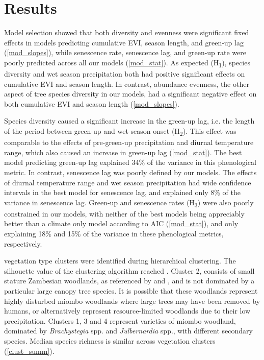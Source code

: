 \documentclass[11pt,a4paper]{article}
\begin{document}
\section{Results}

Model selection showed that both diversity and evenness were significant fixed effects in models predicting cumulative EVI, season length, and green-up lag (\autoref{mod_slopes}), while senescence rate, senescence lag, and green-up rate were poorly predicted across all our models (\autoref{mod_stat}). As expected (H\textsubscript{1}), species diversity and wet season precipitation both had positive significant effects on cumulative EVI and season length. In contrast, abundance evenness, the other aspect of tree species diversity in our models, had a significant negative effect on both cumulative EVI and season length (\autoref{mod_slopes}).

Species diversity caused a significant increase in the green-up lag, i.e. the length of the period between green-up and wet season onset (H\textsubscript{2}). This effect was comparable to the effects of pre-green-up precipitation and diurnal temperature range, which also caused an increase in green-up lag (\autoref{mod_stat}). The best model predicting green-up lag explained 34\% of the variance in this phenological metric. In contrast, senescence lag was poorly defined by our models. The effects of diurnal temperature range and wet season precipitation had wide confidence intervals in the best model for senescence lag, and explained only 8\% of the variance in senescence lag. Green-up and senescence rates (H\textsubscript{3}) were also poorly constrained in our models, with neither of the best models being appreciably better than a climate only model according to AIC (\autoref{mod_stat}), and only explaining 18\% and 15\% of the variance in these phenological metrics, respectively.

\Numberstringnum{\nCluster} vegetation type clusters were identified during hierarchical clustering. The silhouette value of the clustering algorithm reached \silBest{}. Cluster 2, consists of small stature Zambesian woodlands, as referenced by \citet{Dinerstein2017} and \citet{Chidumayo2001}, and is not dominated by a particular large canopy tree species. It is possible that these woodlands represent highly disturbed miombo woodlands where large trees may have been removed by humans, or alternatively represent resource-limited woodlands due to their low precipitation. Clusters 1, 3 and 4 represent varieties of miombo woodland, dominated by \textit{Brachystegia} spp. and \textit{Julbernardia} spp., with different secondary species. Median species richness is similar across vegetation clusters (\autoref{clust_summ}).
\end{document}
